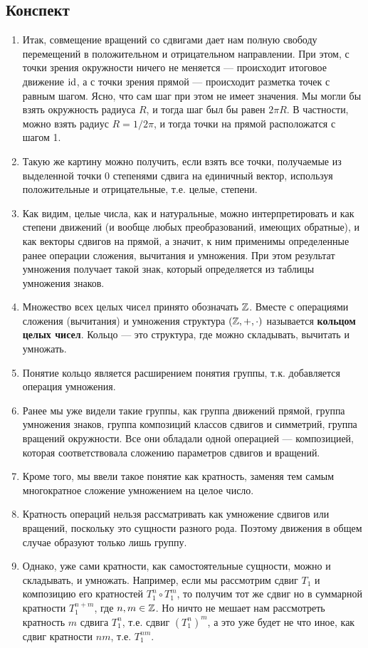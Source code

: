 \subsection*{Конспект}
\begin{enumerate}\setlength{\itemsep}{1pt}
\item Итак, совмещение вращений со сдвигами дает нам полную свободу перемещений в положительном и отрицательном направлении. При этом, с точки зрения окружности ничего не меняется --- происходит итоговое движение $\mathrm{id}$, а с точки зрения прямой --- происходит разметка точек с равным шагом. Ясно, что сам шаг при этом не имеет значения. Мы могли бы взять окружность радиуса $R$, и тогда шаг был бы равен $2\pi R$. В частности, можно взять радиус $R=1/2\pi$, и тогда точки на прямой расположатся с шагом 1.
\item Такую же картину можно получить, если взять все точки, получаемые из выделенной точки 0 степенями сдвига на единичный вектор, используя положительные и отрицательные, т.е. целые, степени.
\item Как видим, целые числа, как и натуральные, можно интерпретировать и как степени движений (и вообще любых преобразований, имеющих обратные), и как векторы сдвигов на прямой, а значит, к ним применимы определенные ранее операции сложения, вычитания и умножения. При этом результат умножения получает такой знак, который определяется из таблицы умножения знаков.
\item Множество всех целых чисел принято обозначать $\mathbb Z$. Вместе с операциями сложения (вычитания) и умножения структура $(\mathbb Z,+,\cdot)$ называется \textbf{кольцом целых чисел}. Кольцо --- это структура, где можно складывать, вычитать и умножать.
\item Понятие кольцо является расширением понятия группы, т.к. добавляется операция умножения.
\item Ранее мы уже видели такие группы, как группа движений прямой, группа умножения знаков, группа композиций классов сдвигов и симметрий, группа вращений окружности. Все они обладали одной операцией --- композицией, которая соответствовала сложению параметров сдвигов и вращений.
\item Кроме того, мы ввели такое понятие как кратность, заменяя тем самым многократное сложение умножением на целое число.
\item Кратность операций нельзя рассматривать как умножение сдвигов или вращений, поскольку это сущности разного рода. Поэтому движения в общем случае образуют только лишь группу.
\item Однако, уже сами кратности, как самостоятельные сущности, можно и складывать, и умножать. Например, если мы рассмотрим сдвиг $T_1$ и композицию его кратностей $T_1^n\circ T_1^m$, то получим тот же сдвиг но в суммарной кратности $T_1^{n+m}$, где $n,m\in\mathbb Z$. Но ничто не мешает нам рассмотреть кратность $m$ сдвига $T_1^n$, т.е. сдвиг $(T_1^n)^m$, а это уже будет не что иное, как сдвиг кратности $nm$, т.е. $T_1^{nm}$.

\end{enumerate}
